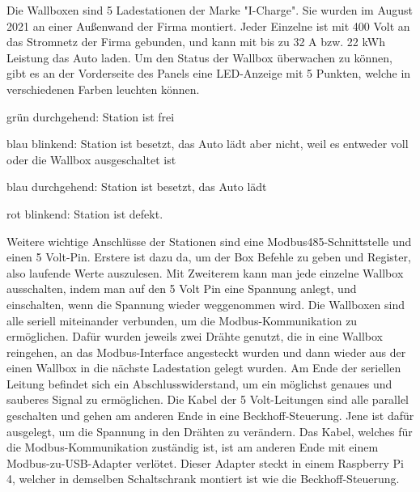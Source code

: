 Die Wallboxen sind 5 Ladestationen der Marke "I-Charge". Sie wurden im August 2021 an einer Außenwand der Firma montiert. Jeder Einzelne ist mit 400 Volt an das Stromnetz der Firma gebunden, und kann mit bis zu 32 A bzw. 22 kWh Leistung das Auto laden. Um den Status der Wallbox überwachen zu können, gibt es an der Vorderseite des Panels eine LED-Anzeige mit 5 Punkten, welche in verschiedenen Farben leuchten können.  

\begin{compactitem}
  \item grün durchgehend: Station ist frei  
  \item blau blinkend: Station ist besetzt, das Auto lädt aber nicht, weil es entweder voll oder die Wallbox ausgeschaltet ist  
  \item blau durchgehend: Station ist besetzt, das Auto lädt 
  \item rot blinkend: Station ist defekt. 
  
\end{compactitem}

Weitere wichtige Anschlüsse der Stationen sind eine Modbus485-Schnittstelle und einen 5 Volt-Pin.  
Erstere ist dazu da, um der Box Befehle zu geben und Register, also laufende Werte auszulesen. Mit Zweiterem kann man jede einzelne Wallbox ausschalten, indem man auf den 5 Volt Pin eine Spannung anlegt, und einschalten, wenn die Spannung wieder weggenommen wird.  
Die Wallboxen sind alle seriell miteinander verbunden, um die Modbus-Kommunikation zu ermöglichen. Dafür wurden jeweils zwei Drähte genutzt, die in eine Wallbox reingehen, an das Modbus-Interface angesteckt wurden und dann wieder aus der einen Wallbox in die nächste Ladestation gelegt wurden. Am Ende der seriellen Leitung befindet sich ein Abschlusswiderstand, um ein möglichst genaues und sauberes Signal zu ermöglichen. Die Kabel der 5 Volt-Leitungen sind alle parallel geschalten und gehen am anderen Ende in eine Beckhoff-Steuerung. Jene ist dafür ausgelegt, um die Spannung in den Drähten zu verändern.  
Das Kabel, welches für die Modbus-Kommunikation zuständig ist, ist am anderen Ende mit einem Modbus-zu-USB-Adapter verlötet. Dieser Adapter steckt in einem Raspberry Pi 4, welcher in demselben Schaltschrank montiert ist wie die Beckhoff-Steuerung. 

